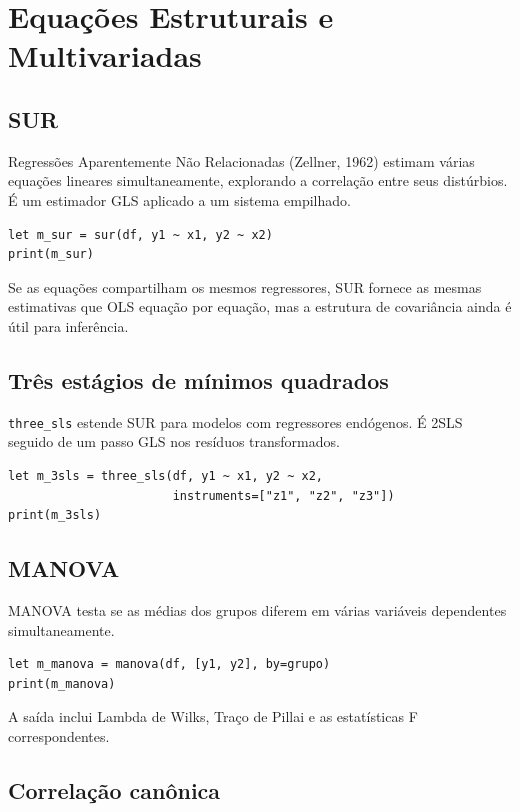 \chapter{Equações Estruturais e Multivariadas}

\section{SUR}

Regressões Aparentemente Não Relacionadas (Zellner, 1962) estimam várias
equações lineares simultaneamente, explorando a correlação entre seus
distúrbios. É um estimador GLS aplicado a um sistema empilhado.

\begin{lstlisting}[caption={SUR}]
let m_sur = sur(df, y1 ~ x1, y2 ~ x2)
print(m_sur)
\end{lstlisting}

Se as equações compartilham os mesmos regressores, SUR fornece as
mesmas estimativas que OLS equação por equação, mas a estrutura de
covariância ainda é útil para inferência.

\section{Três estágios de mínimos quadrados}

\texttt{three\_sls} estende SUR para modelos com regressores endógenos. É 2SLS
seguido de um passo GLS nos resíduos transformados.

\begin{lstlisting}[caption={3SLS}]
let m_3sls = three_sls(df, y1 ~ x1, y2 ~ x2,
                       instruments=["z1", "z2", "z3"])
print(m_3sls)
\end{lstlisting}

\section{MANOVA}

MANOVA testa se as médias dos grupos diferem em várias variáveis
dependentes simultaneamente.

\begin{lstlisting}[caption={MANOVA}]
let m_manova = manova(df, [y1, y2], by=grupo)
print(m_manova)
\end{lstlisting}

A saída inclui Lambda de Wilks, Traço de Pillai e as estatísticas F
correspondentes.

\section{Correlação canônica}

